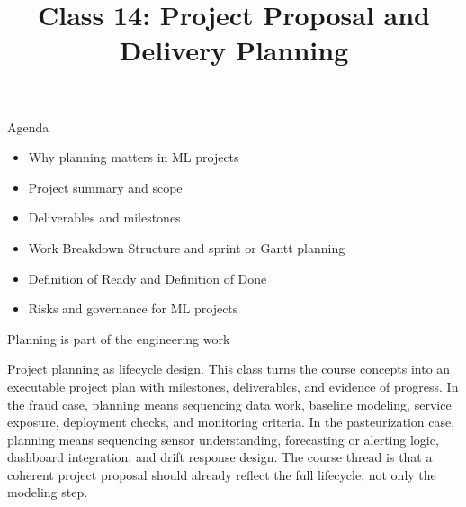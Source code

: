 

\title{Class 14: Project Proposal and Delivery Planning}
\author{\coursename}
\date{}



\frame{\titlepage \coursefooter}

\begin{frame}{Agenda}
\begin{itemize}
\item Why planning matters in ML projects
\item Project summary and scope
\item Deliverables and milestones
\item Work Breakdown Structure and sprint or Gantt planning
\item Definition of Ready and Definition of Done
\item Risks and governance for ML projects
\end{itemize}
\coursefooter
\end{frame}

\begin{frame}{Planning is part of the engineering work}
\coursefooter
\end{frame}

\coursecontextframe
{Project planning as lifecycle design.}
{This class turns the course concepts into an executable project plan with milestones, deliverables, and evidence of progress.}
{In the fraud case, planning means sequencing data work, baseline modeling, service exposure, deployment checks, and monitoring criteria.}
{In the pasteurization case, planning means sequencing sensor understanding, forecasting or alerting logic, dashboard integration, and drift response design.}
{The course thread is that a coherent project proposal should already reflect the full lifecycle, not only the modeling step.}

